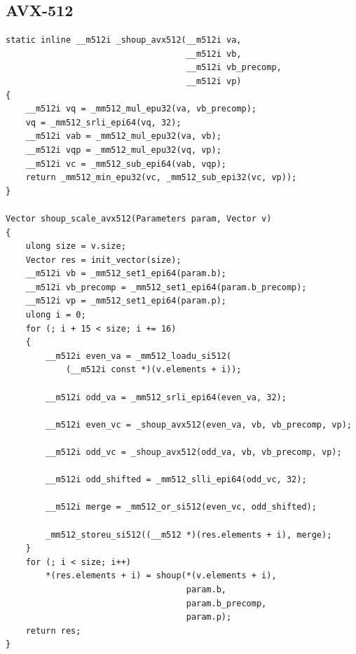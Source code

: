 \documentclass{article}
\begin{document}
\subsection{AVX-512}
\begin{lstlisting}[caption = Variant 1 (AVX512)]
static inline __m512i _shoup_avx512(__m512i va,
                                    __m512i vb,
                                    __m512i vb_precomp,
                                    __m512i vp)
{
    __m512i vq = _mm512_mul_epu32(va, vb_precomp);
    vq = _mm512_srli_epi64(vq, 32);
    __m512i vab = _mm512_mul_epu32(va, vb);
    __m512i vqp = _mm512_mul_epu32(vq, vp);
    __m512i vc = _mm512_sub_epi64(vab, vqp);
    return _mm512_min_epu32(vc, _mm512_sub_epi32(vc, vp));
}

Vector shoup_scale_avx512(Parameters param, Vector v)
{
    ulong size = v.size;
    Vector res = init_vector(size);
    __m512i vb = _mm512_set1_epi64(param.b);
    __m512i vb_precomp = _mm512_set1_epi64(param.b_precomp);
    __m512i vp = _mm512_set1_epi64(param.p);
    ulong i = 0;
    for (; i + 15 < size; i += 16)
    {
        __m512i even_va = _mm512_loadu_si512(
            (__m512i const *)(v.elements + i));

        __m512i odd_va = _mm512_srli_epi64(even_va, 32);

        __m512i even_vc = _shoup_avx512(even_va, vb, vb_precomp, vp);

        __m512i odd_vc = _shoup_avx512(odd_va, vb, vb_precomp, vp);

        __m512i odd_shifted = _mm512_slli_epi64(odd_vc, 32);

        __m512i merge = _mm512_or_si512(even_vc, odd_shifted);

        _mm512_storeu_si512((__m512 *)(res.elements + i), merge);
    }
    for (; i < size; i++)
        *(res.elements + i) = shoup(*(v.elements + i),
                                    param.b,
                                    param.b_precomp,
                                    param.p);
    return res;
}
\end{lstlisting}
\end{document}
